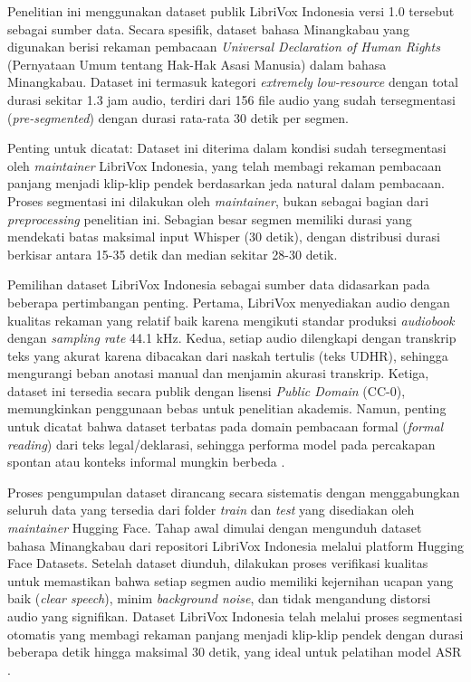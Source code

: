 Penelitian ini menggunakan dataset publik LibriVox Indonesia versi 1.0 tersebut sebagai sumber data. Secara spesifik, dataset bahasa Minangkabau yang digunakan berisi rekaman pembacaan \textit{Universal Declaration of Human Rights} (Pernyataan Umum tentang Hak-Hak Asasi Manusia) dalam bahasa Minangkabau. Dataset ini termasuk kategori \textit{extremely low-resource} dengan total durasi sekitar 1.3 jam audio, terdiri dari 156 file audio yang sudah tersegmentasi (\textit{pre-segmented}) dengan durasi rata-rata 30 detik per segmen.

Penting untuk dicatat: Dataset ini diterima dalam kondisi sudah tersegmentasi oleh \textit{maintainer} LibriVox Indonesia, yang telah membagi rekaman pembacaan panjang menjadi klip-klip pendek berdasarkan jeda natural dalam pembacaan. Proses segmentasi ini dilakukan oleh \textit{maintainer}, bukan sebagai bagian dari \textit{preprocessing} penelitian ini. Sebagian besar segmen memiliki durasi yang mendekati batas maksimal input Whisper (30 detik), dengan distribusi durasi berkisar antara 15-35 detik dan median sekitar 28-30 detik.

Pemilihan dataset LibriVox Indonesia sebagai sumber data didasarkan pada beberapa pertimbangan penting. Pertama, LibriVox menyediakan audio dengan kualitas rekaman yang relatif baik karena mengikuti standar produksi \textit{audiobook} dengan \textit{sampling rate} 44.1 kHz. Kedua, setiap audio dilengkapi dengan transkrip teks yang akurat karena dibacakan dari naskah tertulis (teks UDHR), sehingga mengurangi beban anotasi manual dan menjamin akurasi transkrip. Ketiga, dataset ini tersedia secara publik dengan lisensi \textit{Public Domain} (CC-0), memungkinkan penggunaan bebas untuk penelitian akademis. Namun, penting untuk dicatat bahwa dataset terbatas pada domain pembacaan formal (\textit{formal reading}) dari teks legal/deklarasi, sehingga performa model pada percakapan spontan atau konteks informal mungkin berbeda \cite{koto2020minangkabau}.

Proses pengumpulan dataset dirancang secara sistematis dengan menggabungkan seluruh data yang tersedia dari folder \textit{train} dan \textit{test} yang disediakan oleh \textit{maintainer} Hugging Face. Tahap awal dimulai dengan mengunduh dataset bahasa Minangkabau dari repositori LibriVox Indonesia melalui platform Hugging Face Datasets. Setelah dataset diunduh, dilakukan proses verifikasi kualitas untuk memastikan bahwa setiap segmen audio memiliki kejernihan ucapan yang baik (\textit{clear speech}), minim \textit{background noise}, dan tidak mengandung distorsi audio yang signifikan. Dataset LibriVox Indonesia telah melalui proses segmentasi otomatis yang membagi rekaman panjang menjadi klip-klip pendek dengan durasi beberapa detik hingga maksimal 30 detik, yang ideal untuk pelatihan model ASR \cite{radford2023whisper}.

